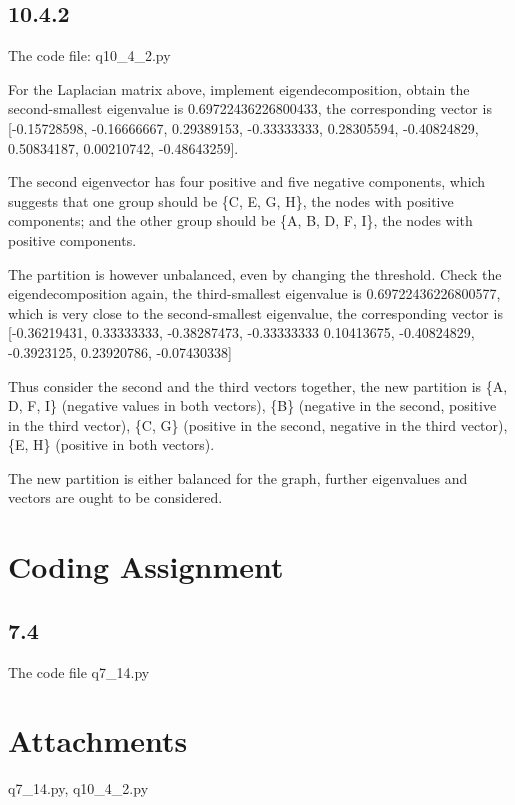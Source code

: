 \documentclass[a4paper, 11pt]{article}
\begin{document}
\subsection*{10.4.2} 

The code file: q10\_4\_2.py

For the Laplacian matrix above, implement eigendecomposition, obtain the second-smallest eigenvalue is  0.69722436226800433, the corresponding vector is  [-0.15728598, -0.16666667, 0.29389153, -0.33333333, 0.28305594, -0.40824829,  0.50834187,  0.00210742, -0.48643259].

The second eigenvector has four positive and five negative components, which suggests that one group should be \{C, E, G, H\}, the nodes with positive components; and the other group should be \{A, B, D, F, I\}, the nodes with positive components. 

The partition is however unbalanced, even by changing the threshold. Check the eigendecomposition again, the third-smallest eigenvalue is 0.69722436226800577, which is very close to the second-smallest eigenvalue, the corresponding vector is [-0.36219431,  0.33333333, -0.38287473, -0.33333333  0.10413675, -0.40824829, -0.3923125,  0.23920786, -0.07430338]

Thus consider the second and the third vectors together, the new partition is \{A, D, F, I\} (negative values in both vectors), \{B\} (negative in the second, positive in the third vector), \{C, G\} (positive in the second, negative in the third vector), \{E, H\} (positive in both vectors).

The new partition is either balanced for the graph, further eigenvalues and vectors are ought to be considered.
  
\section*{Coding Assignment}

\subsection*{7.4}

The code file q7\_14.py

\section*{Attachments}

q7\_14.py, q10\_4\_2.py
\end{document}
